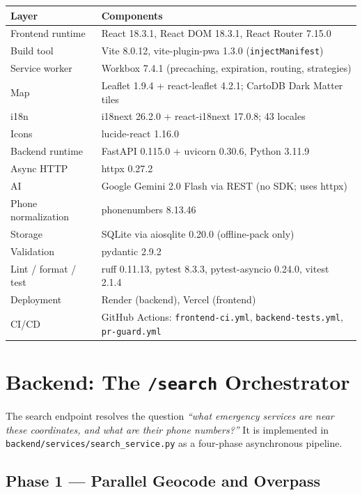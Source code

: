 \documentclass[11pt, a4paper]{article}
\newcommand{\file}[1]{\texttt{\small\color{rsblue}#1}}
\newcommand{\code}[1]{\texttt{\small#1}}
\begin{document}
\begin{tabularx}{\textwidth}{l X}
\toprule
\textbf{Layer} & \textbf{Components} \\
\midrule
Frontend runtime & React 18.3.1, React DOM 18.3.1, React Router 7.15.0 \\
Build tool & Vite 8.0.12, vite-plugin-pwa 1.3.0 (\code{injectManifest}) \\
Service worker & Workbox 7.4.1 (precaching, expiration, routing, strategies) \\
Map & Leaflet 1.9.4 + react-leaflet 4.2.1; CartoDB Dark Matter tiles \\
i18n & i18next 26.2.0 + react-i18next 17.0.8; 43 locales \\
Icons & lucide-react 1.16.0 \\
Backend runtime & FastAPI 0.115.0 + uvicorn 0.30.6, Python 3.11.9 \\
Async HTTP & httpx 0.27.2 \\
AI & Google Gemini 2.0 Flash via REST (no SDK; uses httpx) \\
Phone normalization & phonenumbers 8.13.46 \\
Storage & SQLite via aiosqlite 0.20.0 (offline-pack only) \\
Validation & pydantic 2.9.2 \\
Lint / format / test & ruff 0.11.13, pytest 8.3.3, pytest-asyncio 0.24.0, vitest 2.1.4 \\
Deployment & Render (backend), Vercel (frontend) \\
CI/CD & GitHub Actions: \code{frontend-ci.yml}, \code{backend-tests.yml}, \code{pr-guard.yml} \\
\bottomrule
\end{tabularx}

\section{Backend: The \texttt{/search} Orchestrator}

The search endpoint resolves the question \emph{``what emergency services are near these coordinates, and what are their phone numbers?''} It is implemented in \file{backend/services/search\_service.py} as a four-phase asynchronous pipeline.

\subsection{Phase 1 --- Parallel Geocode and Overpass}
\end{document}
